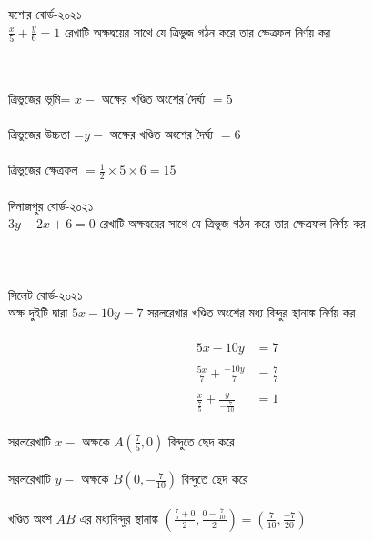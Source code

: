 \documentclass{article}
\begin{document}
		যশোর বোর্ড-২০২১\\
	$\frac{x}{5}+\frac{y}{6}=1$ রেখাটি অক্ষদ্বয়ের সাথে যে ত্রিভুজ গঠন করে তার ক্ষেত্রফল নির্ণয় কর \\ 
	\\ 
\\
ত্রিভুজের ভূমি=  $x-$ অক্ষের খণ্ডিত অংশের  দৈর্ঘ্য $=5$\\
\\
ত্রিভুজের উচ্চতা =$y-$ অক্ষের খণ্ডিত অংশের দৈর্ঘ্য $=6$ \\
\\ 
ত্রিভুজের ক্ষেত্রফল $=\frac{1}{2}\times 5\times 6=15$\\
\\ 
	দিনাজপুর বোর্ড-২০২১\\
 $3y-2x+6=0$ রেখাটি অক্ষদ্বয়ের সাথে যে ত্রিভুজ গঠন করে তার ক্ষেত্রফল নির্ণয় কর \\ 
	\\
	\\
	\\
		সিলেট বোর্ড-২০২১\\ 
	অক্ষ দুইটি দ্বারা $5x-10y=7$ সরলরেখার খণ্ডিত অংশের মধ্য বিন্দুর স্থানাঙ্ক নির্ণয় কর \\ 
	\\ 
	\begin{align*}
	5x-10y&=7\\
	\\
	\frac{5x}{7}+\frac{-10y}{7}&=\frac{7}{7}\\
	\\
	\frac{x}{\frac{7}{5}}+\frac{y}{-\frac{7}{10}}&=1
	\end{align*}
\\
	সরলরেখাটি $x-$ অক্ষকে $A\left(\frac{7}{5},0\right)$ বিন্দুতে  ছেদ করে\\
\\
সরলরেখাটি $y-$ অক্ষকে $B\left(0,-\frac{7}{10}\right)$ বিন্দুতে ছেদ করে\\
\\ 
খণ্ডিত অংশ $AB$ এর মধ্যবিন্দুর স্থানাঙ্ক $\left(\frac{\frac{7}{5}+0}{2},\frac{0-\frac{7}{10}}{2}\right)=\left(\frac{7}{10},\frac{-7}{20}\right)$\\
\end{document}
